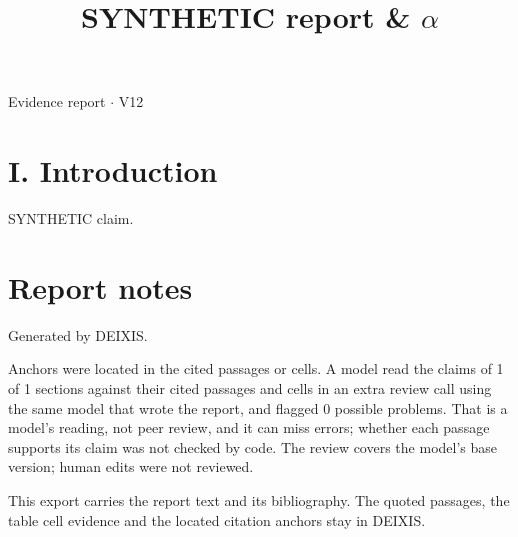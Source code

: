 \documentclass[journal]{IEEEtran}
\begin{document}
\title{SYNTHETIC report \& \ensuremath{\alpha}}

\maketitle

\noindent Evidence report \ensuremath{\cdot} V12

\section*{I. Introduction}

SYNTHETIC claim. \cite{Synth26}

\section*{Report notes}

Generated by DEIXIS.

Anchors were located in the cited passages or cells. A model read the claims of 1 of 1 sections against their cited passages and cells in an extra review call using the same model that wrote the report, and flagged 0 possible problems. That is a model’s reading, not peer review, and it can miss errors; whether each passage supports its claim was not checked by code. The review covers the model's base version; human edits were not reviewed.

This export carries the report text and its bibliography. The quoted passages, the table cell evidence and the located citation anchors stay in DEIXIS.




\end{document}
